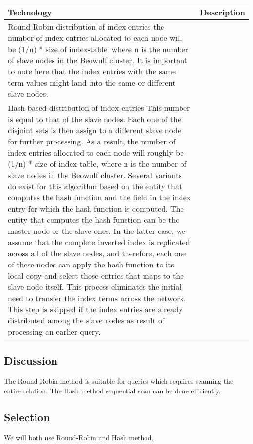 \begin{center}
    \begin{tabular}{ | l | p{10cm} |} 
    \hline
    Technology & Description    \\ \hline
    Round-Robin distribution of index entries 
    the number of index entries allocated to each node will be (1/n) * size of index-table, where n is the number of slave nodes in the      Beowulf cluster. It is important to note here that the index entries with the same term values might land into the same or different slave nodes.   \\ \hline
    Hash-based distribution of index entries
    This number is equal to that of the slave nodes. Each one of the disjoint sets is then assign to a different slave node for further processing. As a result, the number of index entries allocated to each node will roughly be (1/n) * size of index-table, where n is the number of slave nodes in the Beowulf cluster. Several variants do exist for this algorithm based on the entity that computes the hash function and the field in the index entry for which the hash function is computed. The entity that computes the hash function can be the master node or the slave ones. In the latter case, we assume that the complete inverted index is replicated across all of the slave nodes, and therefore, each one of these nodes can apply the hash function to its local copy and select those entries that maps to the slave node itself. This process eliminates the initial need to transfer the index terms across the network. This step is skipped if the index entries are already distributed among the slave nodes as result of processing an earlier query. \\ \hline
    \end{tabular}
\end{center}

\subsection{Discussion}

The Round-Robin method is suitable for queries which requires scanning the entire relation. 
The Hash method sequential scan can be done efficiently.

\subsection{Selection}

We will both use Round-Robin and Hash method. 

